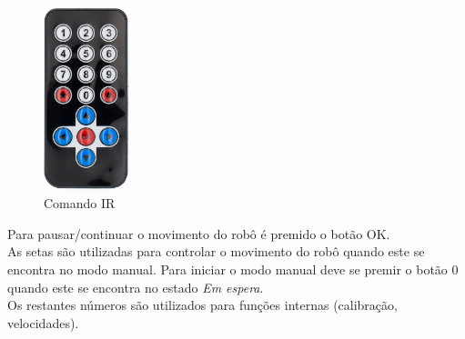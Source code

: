 \documentclass[]{report}
\begin{document}
\begin{figure}[!htb]
	\centering
	\includegraphics[width=2.5cm]{imagens/comando}
	\caption{Comando IR}
\end{figure}

\noindent Para pausar/continuar o movimento do robô é premido o botão OK. \\
As setas são utilizadas para controlar o movimento do robô quando este se encontra no modo manual.
Para iniciar o modo manual deve se premir o botão 0 quando este se encontra no estado \textit{Em espera}. \\
Os restantes números são utilizados para funções internas (calibração, velocidades).
\end{document}
